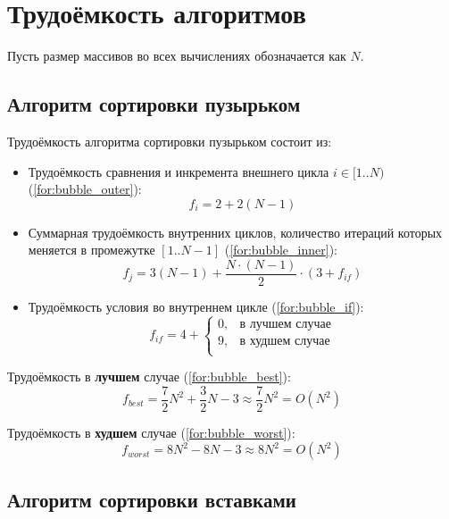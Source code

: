 \documentclass[12pt]{report}
\begin{document}
\section{Трудоёмкость алгоритмов}

Пусть размер массивов во всех вычислениях обозначается как $N$.

\subsection{Алгоритм сортировки пузырьком}

Трудоёмкость алгоритма сортировки пузырьком состоит из:
\begin{itemize}
	\item Трудоёмкость сравнения и инкремента внешнего цикла $i \in [1..N)$ (\ref{for:bubble_outer}):
	\begin{equation}
	\label{for:bubble_outer}
	f_{i} = 2 + 2(N - 1)
	\end{equation}
	\item Суммарная трудоёмкость внутренних циклов, количество итераций которых меняется в промежутке $[1..N-1]$ (\ref{for:bubble_inner}):
	\begin{equation}
	\label{for:bubble_inner}
	f_{j} = 3(N - 1) + \frac{N \cdot (N - 1)}{2} \cdot (3 + f_{if})
	\end{equation}
	\item Трудоёмкость условия во внутреннем цикле (\ref{for:bubble_if}):
	\begin{equation}
	\label{for:bubble_if}
	f_{if} = 4 + \begin{cases}
	0, & \text{в лучшем случае}\\
	9, & \text{в худшем случае}\\
	\end{cases}
	\end{equation}
\end{itemize}

Трудоёмкость в \textbf{лучшем} случае (\ref{for:bubble_best}):
\begin{equation}
\label{for:bubble_best}
f_{best} = \frac{7}{2} N^2 + \frac{3}{2} N - 3 \approx \frac{7}{2} N^2 = O(N^2)
\end{equation}

Трудоёмкость в \textbf{худшем} случае (\ref{for:bubble_worst}):
\begin{equation}
\label{for:bubble_worst}
f_{worst} =  8N^2 - 8N - 3 \approx 8N^2 = O(N^2)
\end{equation}

\subsection{Алгоритм сортировки вставками}
\end{document}
